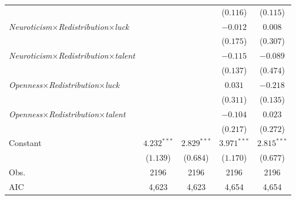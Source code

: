 \begin{footnotesize}
\begin{longtable}{l cc cc}
    &  &  & ($0.116$) & ($0.115$) \\
\textit{Neuroticism}$\times$\textit{Redistribution}$\times$\textit{luck} &  &  & $-0.012$ & $0.008$ \\
    &  &  & ($0.175$) & ($0.307$) \\
\textit{Neuroticism}$\times$\textit{Redistribution}$\times$\textit{talent} &  &  & $-0.115$ & $-0.089$ \\
    &  &  & ($0.137$) & ($0.474$) \\
\textit{Openness}$\times$\textit{Redistribution}$\times$\textit{luck} &  &  & $0.031$ & $-0.218$ \\
    &  &  & ($0.311$) & ($0.135$) \\
\textit{Openness}$\times$\textit{Redistribution}$\times$\textit{talent} &  &  & $-0.104$ & $0.023$ \\
    &  &  & ($0.217$) & ($0.272$) \\
Constant & $4.232^{***}$ & $2.829^{***}$ & $3.971^{***}$ & $2.815^{***}$ \\
    & ($1.139$) & ($0.684$) & ($1.170$) & ($0.677$) \\
\midrule
Obs. & 2196 & 2196 & 2196 & 2196 \\
AIC  & 4,623 & 4,623 & 4,654 & 4,654 \\
\end{longtable}
\end{footnotesize}
